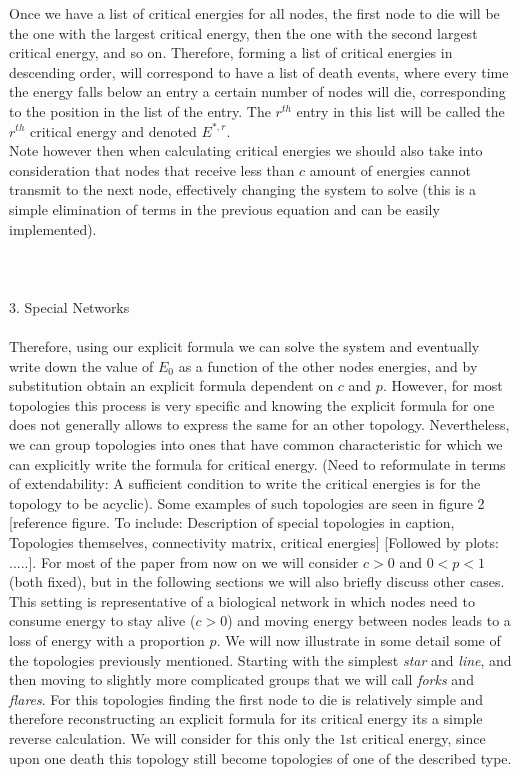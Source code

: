 \documentclass{amsart}
\theoremstyle{plain}
\numberwithin{equation}{section}
\begin{document}
	Once we have a list of critical energies for all nodes, the first node to die will be the one with the largest critical energy, then the one with the second largest critical energy, and so on. Therefore, forming a list of critical energies in descending order, will correspond to have a list of death events, where every time the energy falls below an entry a certain number of nodes will die, corresponding to the position in the list of the entry. The $r^{th}$ entry in this list will be called the $r^{th}$ critical energy and denoted $E^{*,r}$.\\
Note however then when calculating critical energies we should also take into consideration that nodes that receive less than $c$ amount of energies cannot transmit to the next node, effectively changing the system to solve (this is a simple elimination of terms in the previous equation and can be easily implemented).
	\\
	\\
	\\
	\\
3. Special Networks\\
\\
Therefore, using our explicit formula we can solve the system and eventually write down the value of $E_0$ as a function of the other nodes energies, and by substitution obtain an explicit formula dependent on $c$ and $p$. However, for most topologies this process is very specific and knowing the explicit formula for one does not generally allows to express the same for an other topology.
Nevertheless, we can group topologies into ones that have common characteristic for which we can explicitly write the formula for critical energy. (Need to reformulate in terms of extendability: A sufficient condition to write the critical energies is for the topology to be acyclic). Some examples of such topologies are seen in figure 2 [reference figure. To include: Description of special topologies in caption, Topologies themselves, connectivity matrix, critical energies] 
[Followed by plots: .....].
For most of the paper from now on we will consider $c>0$ and $0<p<1$ (both fixed), but in the following sections we will also briefly discuss other cases. This setting is representative of a  biological network in which nodes need to consume energy to stay alive ($c>0$) and moving energy between nodes leads to a loss of energy with a proportion $p$.
We will now illustrate in some detail some of the topologies previously mentioned. Starting with the simplest \textit{star} and \textit{line}, and then moving to slightly more complicated groups that we will call \textit{forks} and \textit{flares}. For this topologies finding the first node to die is relatively simple and therefore reconstructing an explicit formula for its critical energy its a simple reverse calculation. We will consider for this only the $1$st critical energy, since upon one death this topology still become topologies of one of the described type.\\
\end{document}
